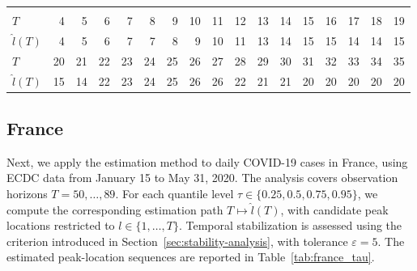 \documentclass[12pt,a4paper]{article}
\begin{document}
{\begin{landscape}
\begin{table}[htbp]
\begin{tabular*}{\linewidth}{@{\extracolsep{\fill}}lrrrrrrrrrrrrrrrr}
					\midrule\addlinespace[2.5pt]
					\multicolumn{17}{c}{\textbf{$\tau=0.95,\ T_{\mathrm{entry}}=28,\ \varepsilon=3$}} \\
					\addlinespace[2.5pt]
					\midrule
					$T$ & 4 & 5 & 6 & 7 & 8 & 9 & 10 & 11 & 12 & 13 & 14 & 15 & 16 & 17 & 18 & 19 \\
					$\hat{l}(T)$ & 4 & 5 & 6 & 7 & 7 & 8 & 9 & 10 & 11 & 13 & 14 & 15 & 15 & 14 & 14 & 15 \\
					$T$ & 20 & 21 & 22 & 23 & 24 & 25 & 26 & 27 & 28 & 29 & 30 & 31 & 32 & 33 & 34 & 35 \\
					$\hat{l}(T)$ & 15 & 14 & 22 & 23 & 24 & 25 & 26 & 26 & 22 & 21 & 21 & 20 & 20 & 20 & 20 & 20 \\
					\bottomrule
				\end{tabular*}
			\end{table}
		\end{landscape}
		
		\subsection{France}
		\label{subsec:france}
		
		Next, we apply the estimation method to daily COVID-19 cases in France, using ECDC data from January 15 to May 31, 2020. The analysis covers observation horizons $T=50,\ldots,89$. For each quantile level $\tau\in\{0.25,0.5,0.75,0.95\}$, we compute the corresponding estimation path $T\mapsto\hat{l}(T)$, with candidate peak locations restricted to $l\in\{1,\ldots,T\}$. Temporal stabilization is assessed using the criterion introduced in Section~\ref{sec:stability-analysis}, with tolerance $\varepsilon=5$. The estimated peak-location sequences are reported in Table~\ref{tab:france_tau}.
		
}
\end{document}
